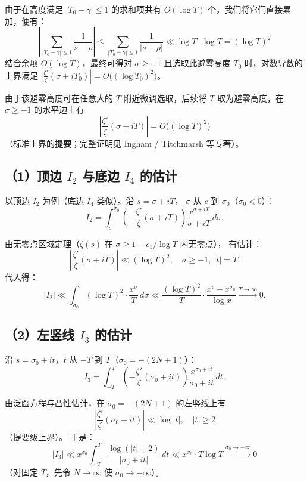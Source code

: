 由于在高度满足 $|T_0 - \gamma| \le 1$ 的求和项共有 $O(\log T)$ 个，我们将它们直接累加，便有：
\[
\left| \sum_{|T_0 - \gamma| \le 1} \frac{1}{s - \rho} \right| \le \sum_{|T_0 - \gamma| \le 1} \frac{1}{|s-\rho|} \ll \log T \cdot \log T = (\log T)^2
\]
结合余项 $O(\log T)$，最终可得对 $\sigma \ge -1$ 且选取此避零高度 $T_0$ 时，对数导数的上界满足 $\left|\frac{\zeta'}{\zeta}(\sigma+iT_0)\right| = O\bigl((\log T_0)^2\bigr)$。

由于该避零高度可在任意大的 $T$ 附近微调选取，后续将 $T$ 取为避零高度，在 $\sigma\ge -1$ 的水平边上有
\[
\left|\frac{\zeta'}{\zeta}(\sigma+iT)\right| = O\bigl((\log T)^2\bigr)
\]
（标准上界的\textbf{提要}；完整证明见 Ingham / Titchmarsh 等专著）。

\subsection*{（1）顶边 $I_2$ 与底边 $I_4$ 的估计}

以顶边 $I_2$ 为例（底边 $I_4$ 类似）。沿 $s=\sigma+iT$，
$\sigma$ 从 $c$ 到 $\sigma_0$（$\sigma_0<0$）：
\[
I_2 = \int_c^{\sigma_0} \left(-\frac{\zeta'}{\zeta}(\sigma+iT)\right) 
      \frac{x^{\sigma+iT}}{\sigma+iT}\, d\sigma.
\]

由无零点区域定理（$\zeta(s)$ 在 $\sigma\ge 1-c_1/\log T$ 内无零点），
有估计：
\[
\left|\frac{\zeta'}{\zeta}(\sigma+iT)\right| \ll (\log T)^2,
\quad \sigma\ge -1,\ |t|=T.
\]
代入得：
\[
|I_2| \ll \int_{\sigma_0}^{c} (\log T)^2 \cdot \frac{x^\sigma}{T}\, d\sigma
\ll \frac{(\log T)^2}{T} \cdot \frac{x^c - x^{\sigma_0}}{\log x}
\xrightarrow{T\to\infty} 0.
\]

\subsection*{（2）左竖线 $I_3$ 的估计}

沿 $s=\sigma_0+it$，$t$ 从 $-T$ 到 $T$（$\sigma_0=-(2N+1)$）：
\[
I_3 = \int_{-T}^{T} \left(-\frac{\zeta'}{\zeta}(\sigma_0+it)\right) 
      \frac{x^{\sigma_0+it}}{\sigma_0+it}\, dt.
\]

由泛函方程与凸性估计，在 $\sigma_0=-(2N+1)$ 的左竖线上有
\[
\left|\frac{\zeta'}{\zeta}(\sigma_0+it)\right| \ll \log |t|,\quad |t|\ge 2
\]
（提要级上界）。
于是：
\[
|I_3| \ll x^{\sigma_0} \int_{-T}^{T} \frac{\log(|t|+2)}{|\sigma_0+it|}\, dt
\ll x^{\sigma_0} \cdot T \log T
\xrightarrow{\sigma_0\to-\infty} 0
\]
（对固定 $T$，先令 $N\to\infty$ 使 $\sigma_0\to -\infty$）。



